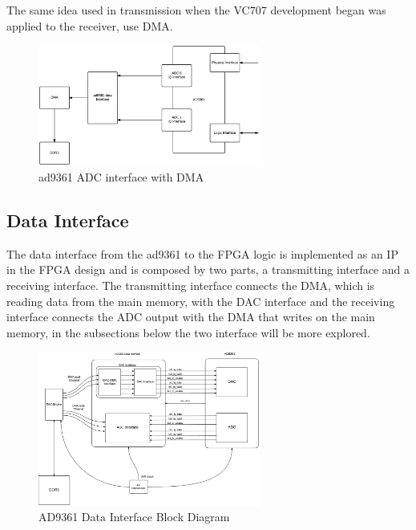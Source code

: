 The same idea used in transmission when the VC707 development began was applied
to the receiver, use DMA.

\begin{figure}[htbp]
    \centering
    \includegraphics[width=0.65\textwidth]{./figures/adc_dma}
    \caption{ ad9361 ADC interface with DMA
    \label{fig:ad9361rxdma}}
\end{figure}


\subsection{Data Interface}

The data interface from the ad9361 to the FPGA logic is implemented as an IP in
the FPGA design and is composed by two parts, a transmitting interface and a
receiving interface. The transmitting interface connects the DMA, which is
reading data from the main memory, with the DAC interface and the receiving
interface connects the ADC output with the DMA that writes on the main memory,
in the subsections below the two interface will be more explored.

\begin{figure}[htbp]
    \centering
    \includegraphics[width=0.65\textwidth]{./figures/data_if}
    \caption{ AD9361 Data Interface Block Diagram
    \label{fig:databd}}
\end{figure}

